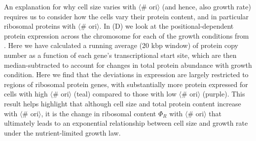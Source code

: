 An explanation for why cell size varies with $\langle$\# ori$\rangle$ (and
hence, also growth rate) requires us to consider how the cells vary their
protein content, and in particular ribosomal proteins with $\langle$\#
ori$\rangle$. In (D) we look at the
positional-dependent protein expression across the chromosome for each of the
growth conditions from \cite{schmidt2016}. Here we have calculated a running
average (20 kbp window) of protein copy number as a function of each gene's
transcriptional start site, which are then median-subtracted to  account for
changes in total protein abundance with growth condition. Here we find that the
deviations in expression are largely restricted to regions of ribosomal protein
genes, with substantially more protein expressed for cells with high $\langle$\#
ori$\rangle$ (teal) compared to those with low $\langle$\# ori$\rangle$
(purple). This result helps highlight that although cell size and total protein
content increase with $\langle$\# ori$\rangle$, it is the change in  ribosomal
content $\Phi_R$ with $\langle$\# ori$\rangle$ that ultimately leads to an
exponential relationship between cell size and growth rate under the
nutrient-limited growth law.

